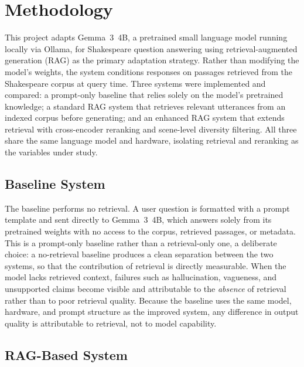 \section{Methodology}
\label{sec:methodology}

This project adapts Gemma~3~4B, a pretrained small language model running
locally via Ollama, for Shakespeare question answering using
retrieval-augmented generation (RAG) as the primary adaptation strategy.
Rather than modifying the model's weights, the system conditions
responses on passages retrieved from the Shakespeare corpus at query
time. Three systems were implemented and compared: a prompt-only baseline
that relies solely on the model's pretrained knowledge; a standard RAG
system that retrieves relevant utterances from an indexed corpus before
generating; and an enhanced RAG system that extends retrieval with
cross-encoder reranking and scene-level diversity filtering. All three
share the same language model and hardware, isolating retrieval and
reranking as the variables under study.

\subsection{Baseline System}
The baseline performs no retrieval. A user question is formatted with a
prompt template and sent directly to Gemma~3~4B, which answers solely
from its pretrained weights with no access to the corpus, retrieved
passages, or metadata. This is a prompt-only baseline rather than a
retrieval-only one, a deliberate choice: a no-retrieval baseline produces
a clean separation between the two systems, so that the contribution of
retrieval is directly measurable. When the model lacks retrieved context,
failures such as hallucination, vagueness, and unsupported claims become
visible and attributable to the \emph{absence} of retrieval rather than
to poor retrieval quality. Because the baseline uses the same model,
hardware, and prompt structure as the improved system, any difference in
output quality is attributable to retrieval, not to model capability.

\subsection{RAG-Based System}

